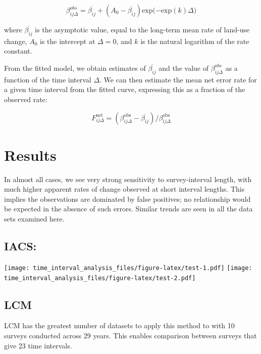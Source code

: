 \documentclass[
]{book}
\begin{document}
\begin{equation} \label{eq:asymptote}
\beta_{ij\Delta}^{obs} = \overline{\beta_{ij}} + (A_0 - \overline{\beta_{ij}}) \mathrm{exp(-exp}(k) \Delta)
\end{equation}

where \(\overline{\beta_{ij}}\) is the asymptotic value, equal to the long-term mean rate of land-use change, \(A_0\) is the intercept at \(\Delta = 0\), and \(k\) is the natural logarithm of the rate constant.

From the fitted model, we obtain estimates of \(\overline{\beta_{ij}}\) and the value of \(\beta_{ij\Delta}^{obs}\) as a function of the time interval \(\Delta\).
We can then estimate the mean net error rate for a given time interval from the fitted curve, expressing this as a fraction of the observed rate:

\begin{equation} \label{eq:Fnet_errors}
F_{ij\Delta}^\mathrm{net} = (\beta_{ij\Delta}^{\mathrm{obs}} - \overline{\beta_{ij}}) / \beta_{ij\Delta}^{\mathrm{obs}}
\end{equation}

\hypertarget{results-2}{%
\section{Results}\label{results-2}}

In almost all cases, we see very strong sensitivity to survey-interval length, with much higher apparent rates of change observed at short interval lengths. This implies the observations are dominated by false positives; no relationship would be expected in the absence of such errors. Similar trends are seen in all the data sets examined here.

\hypertarget{iacs}{%
\subsection{IACS:}\label{iacs}}

\texttt{[image: time\_interval\_analysis\_files/figure-latex/test-1.pdf]} \texttt{[image: time\_interval\_analysis\_files/figure-latex/test-2.pdf]}

\hypertarget{lcm}{%
\subsection{LCM}\label{lcm}}

LCM has the greatest number of datasets to apply this method to with 10 surveys conducted across 29 years. This enables comparison between surveys that give 23 time intervals.
\end{document}
